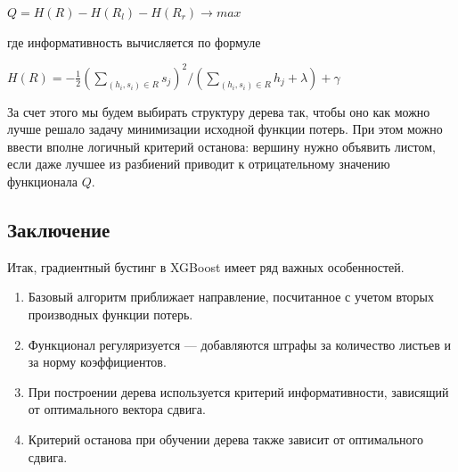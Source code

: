 \documentclass{article}
\theoremstyle{definition}
\theoremstyle{theorem}
\theoremstyle{remark}
\theoremstyle{theorem}
\theoremstyle{example}
\theoremstyle{theorem}
\theoremstyle{theorem}
\theoremstyle{theorem}
\theoremstyle{theorem}
\begin{document}
$Q = H(R) - H(R_l) - H(R_r) \rightarrow max$

где информативность вычисляется по формуле

$H(R) = - \frac{1}{2} \left(\sum\limits_{(h_i,s_i)\in R} s_j\right)^2 \bigg/  \left(\sum\limits_{(h_i,s_i)\in R} h_j + \lambda\right)  +\gamma$

За счет этого мы будем выбирать структуру дерева так, чтобы оно как можно лучше решало задачу минимизации исходной функции потерь. При этом можно ввести
вполне логичный критерий останова: вершину нужно объявить листом, если даже
лучшее из разбиений приводит к отрицательному значению функционала $Q$.

\subsection{Заключение}

Итак, градиентный бустинг в XGBoost имеет ряд важных особенностей.

\begin{enumerate}
	\item Базовый алгоритм приближает направление, посчитанное с учетом вторых производных функции потерь.
	\item Функционал регуляризуется --- добавляются штрафы за количество листьев и
	за норму коэффициентов.
	\item При построении дерева используется критерий информативности, зависящий
	от оптимального вектора сдвига.
	\item  Критерий останова при обучении дерева также зависит от оптимального сдвига.
\end{enumerate}
\end{document}
